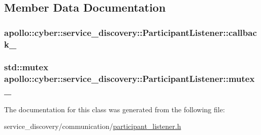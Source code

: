 \subsection{Member Data Documentation}
\hypertarget{classapollo_1_1cyber_1_1service__discovery_1_1ParticipantListener_ac402f1152bd826e26d4e2153e87cb5d9}{
\subsubsection[{callback\-\_\-}]{ apollo\-::cyber\-::service\-\_\-discovery\-::\-Participant\-Listener\-::callback\-\_\-\hspace{0.3cm}{\ttfamily [private]}}}\label{classapollo_1_1cyber_1_1service__discovery_1_1ParticipantListener_ac402f1152bd826e26d4e2153e87cb5d9}
\hypertarget{classapollo_1_1cyber_1_1service__discovery_1_1ParticipantListener_ac9df2d48a1b024f63f85f68cb2965088}{
\subsubsection[{mutex\-\_\-}]{\setlength{\rightskip}{0pt plus 5cm}std\-::mutex apollo\-::cyber\-::service\-\_\-discovery\-::\-Participant\-Listener\-::mutex\-\_\-\hspace{0.3cm}{\ttfamily [private]}}}\label{classapollo_1_1cyber_1_1service__discovery_1_1ParticipantListener_ac9df2d48a1b024f63f85f68cb2965088}


The documentation for this class was generated from the following file\-:\begin{DoxyCompactItemize}
\item 
service\-\_\-discovery/communication/\hyperlink{participant__listener_8h}{participant\-\_\-listener.\-h}\end{DoxyCompactItemize}
